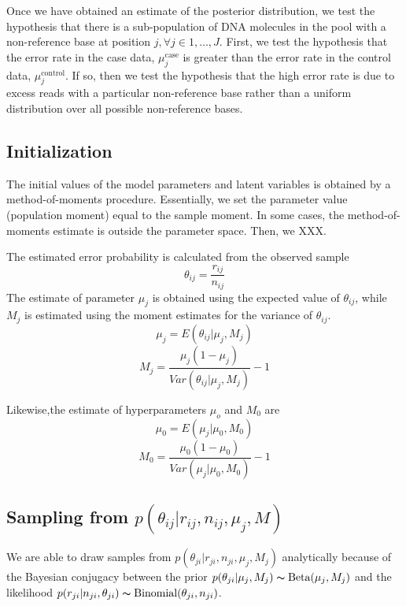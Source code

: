 \documentclass[11pt,reqno]{amsart}
\begin{document}
Once we have obtained an estimate of the posterior distribution, we test the hypothesis that there is a sub-population of DNA molecules in the pool with a non-reference base at position $j, \forall j \in 1, \ldots, J$. First, we test the hypothesis that the error rate in the case data, $\mu_j^{\text{case}}$ is greater than the error rate in the control data, $\mu_j^{\text{control}}$. If so, then we test the hypothesis that the high error rate is due to excess reads with a particular non-reference base rather than a uniform distribution over all possible non-reference bases.

\subsection{Initialization}
The initial values of the model parameters and latent variables is obtained by a method-of-moments procedure. Essentially, we set the parameter value (population moment) equal to the sample moment. In some cases, the method-of-moments estimate is outside the parameter space. Then, we XXX.

The estimated error probability is calculated from the observed sample
\begin{equation}
 \theta_{ij}=\frac{r_{ij}}{n_{ij}}
\end{equation}
The estimate of parameter $\mu_j$ is obtained using the expected value of $\theta_{ij}$, while $M_j$ is estimated using the moment estimates for the variance of $\theta_{ij}$.
\begin{equation}
 \mu_j=E(\theta_{ij}|\mu_j,M_j)
\end{equation}
\begin{equation}
 M_j=\frac{\mu_j(1-\mu_j)}{Var(\theta_{ij}|\mu_j,M_j)}-1
\end{equation}

Likewise,the estimate of hyperparameters $\mu_o$ and $M_0$ are
\begin{equation}
 \mu_0=E(\mu_j|\mu_0,M_0)
\end{equation}
\begin{equation}
 M_0=\frac{\mu_0(1-\mu_0)}{Var(\mu_j|\mu_0,M_0)}-1
\end{equation}


\subsection{Sampling from $p \left( \theta_{ij} |r_{ij},n_{ij},\mu_j,M \right)$}

We are able to draw samples from $p(\theta_{ji} | r_{ji}, n_{ji}, \mu_j, M_j)$ analytically because of the Bayesian conjugacy between the prior $p(\theta_{ji} | \mu_j, M_j) \thicksim \text{Beta}(\mu_j, M_j)$ and the likelihood $p(r_{ji} | n_{ji}, \theta_{ji}) \thicksim \text{Binomial}(\theta_{ji}, n_{ji})$. 
\end{document}
